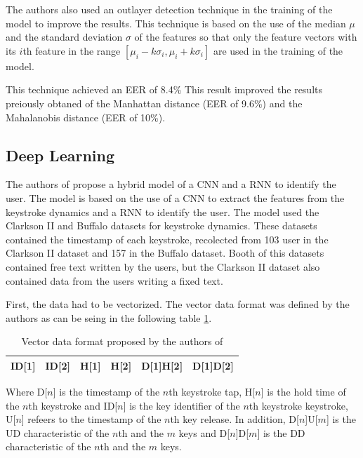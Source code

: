 The authors also used an outlayer detection technique in the training of the model to improve the results. This technique is based on the use of the median $\mu$ and the standard deviation $\sigma$ of the features so that only the feature vectors with  its $i$th feature in the range $[\mu_i - k\sigma_i, \mu_i + k\sigma_i]$ are used in the training of the model.

This technique achieved an EER of 8.4\% This result improved the results preiously obtaned \cite{killourhy2009comparing} of the Manhattan distance (EER of 9.6\%) and the Mahalanobis distance (EER of 10\%).

\subsection{Deep Learning}

The authors of \cite{deep_learning} propose a hybrid model of a CNN and a RNN to identify the user. The model is based on the use of a CNN to extract the features from the keystroke dynamics and a RNN to identify the user. The model used the Clarkson II and Buffalo datasets for keystroke dynamics. These datasets contained the timestamp of each keystroke, recolected from 103 user in the Clarkson II dataset and 157 in the Buffalo dataset. Booth of this datasets contained free text written by the users, but the Clarkson II dataset also contained data from the users writing a fixed text.

First, the data had to be vectorized. The vector data format was defined by the authors as can be seing in the following table \ref{tab:deep_learning_vector_data_format}.

\begin{table}[H]
	\centering
	\begin{tabular}{|c|c|c|c|c|c|}
		\hline
		ID{[}1{]} & ID{[}2{]} & H{[}1{]} & H{[}2{]} & D{[}1{]}H{[}2{]} & D{[}1{]}D{[}2{]} \\ \hline
	\end{tabular}
	\caption{Vector data format proposed by the authors of \cite{deep_learning}}
	\label{tab:deep_learning_vector_data_format}
\end{table}

Where D[$n$] is the timestamp of the $n$th keystroke tap, H[$n$] is the hold time of the $n$th keystroke and ID[$n$] is the key identifier of the $n$th keystroke keystroke, U[$n$] refeers to the timestamp of the $n$th key release. In addition, D[$n$]U[$m$] is the UD characteristic of the $n$th and the $m$ keys and D[$n$]D[$m$] is the DD characteristic of the $n$th and the $m$ keys.

